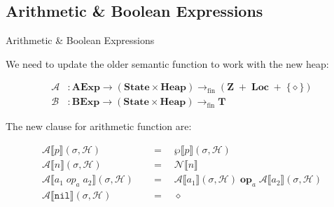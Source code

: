 \documentclass[xcolor=svgnames,11pt]{beamer}
\begin{document}
\subsection{Arithmetic \& Boolean Expressions}
\begin{frame}{Arithmetic \& Boolean Expressions}

We need to update the older semantic function to work with the new heap:

\begin{align*}
\mathcal{A} &: \mathbf{AExp} \rightarrow (\mathbf{State} \times \mathbf{Heap}) \rightarrow_{\mathrm{fin}} (\mathbf{Z} \;+\; \mathbf{Loc} \;+\; \{\diamond\} ) \\
\mathcal{B} &: \mathbf{BExp} \rightarrow (\mathbf{State} \times \mathbf{Heap}) \rightarrow_{\mathrm{fin}} \mathbf{T}
\end{align*}

The new clause for arithmetic function are:

\begin{align*}
\mathcal{A} \llbracket p \rrbracket (\sigma, \mathcal{H}) \quad &= \quad \wp \llbracket p \rrbracket (\sigma, \mathcal{H}) \\
\mathcal{A} \llbracket n \rrbracket (\sigma, \mathcal{H}) \quad &= \quad \mathcal{N} \llbracket n \rrbracket \\
\mathcal{A} \llbracket a_1 \; op_a \; a_2 \rrbracket (\sigma, \mathcal{H}) \quad &= \quad \mathcal{A} \llbracket a_1 \rrbracket (\sigma, \mathcal{H}) \;\mathbf{op}_a\; \mathcal{A} \llbracket a_2 \rrbracket (\sigma, \mathcal{H}) \\
\mathcal{A} \llbracket \mathtt{nil} \rrbracket (\sigma, \mathcal{H}) \quad &= \quad \diamond
\end{align*}
\end{frame}
\end{document}
